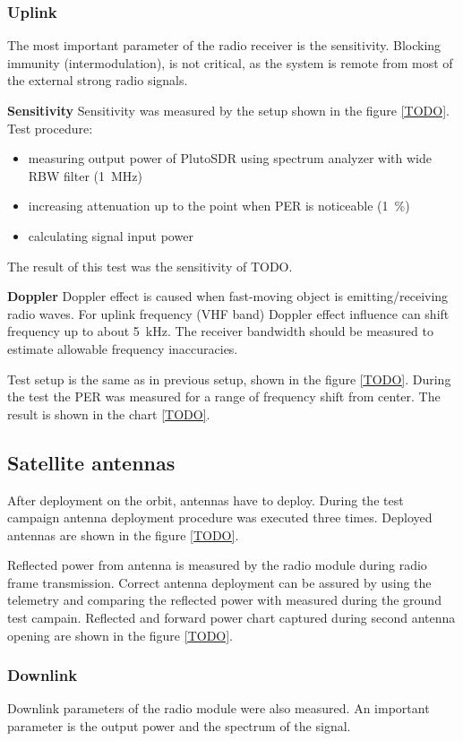 \subsubsection{Uplink}
The most important parameter of the radio receiver is the sensitivity. Blocking immunity (intermodulation), is not critical, as the system is remote from most of the external strong radio signals.

\textbf{Sensitivity}
Sensitivity was measured by the setup shown in the figure \ref{TODO}. Test procedure:
\begin{itemize}
    \item measuring output power of PlutoSDR using spectrum analyzer with wide RBW filter (\SI{1}{\MHz})
    \item increasing attenuation up to the point when PER is noticeable (\SI{1}{\percent})
    \item calculating signal input power
\end{itemize}

The result of this test was the sensitivity of TODO.

\textbf{Doppler}
Doppler effect is caused when fast-moving object is emitting/receiving radio waves. For uplink frequency (VHF band) Doppler effect influence can shift frequency up to about \SI{5}{\kHz}. The receiver bandwidth should be measured to estimate allowable frequency inaccuracies.

Test setup is the same as in previous setup, shown in the figure \ref{TODO}. During the test the PER was measured for a range of frequency shift from center. The result is shown in the chart \ref{TODO}.

\subsection{Satellite antennas}
After deployment on the orbit, antennas have to deploy. During the test campaign antenna deployment procedure was executed three times. Deployed antennas are shown in the figure \ref{TODO}.

Reflected power from antenna is measured by the radio module during radio frame transmission. Correct antenna deployment can be assured by using the telemetry and comparing the reflected power with measured during the ground test campain. 
Reflected and forward power chart captured during second antenna opening are shown in the figure \ref{TODO}. 



\subsubsection{Downlink}
Downlink parameters of the radio module were also measured. An important parameter is the output power and the spectrum of the signal.

